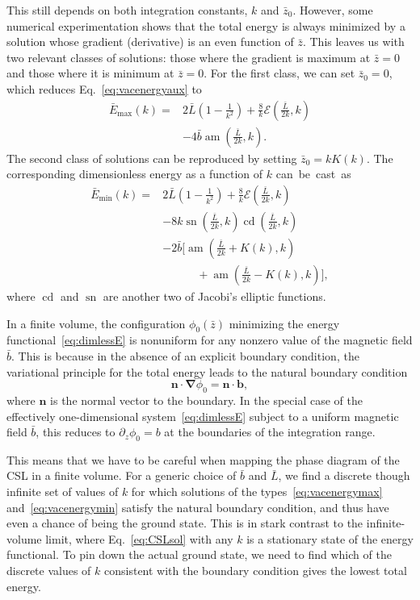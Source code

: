 \documentclass[pdflatex,iicol,sn-mathphys-num]{sn-jnl}
\let\p=\phi
\let\de=\partial
\DeclareMathOperator{\am}{am}%
\DeclareMathOperator{\cd}{cd}%
\DeclareMathOperator{\sn}{sn}%
\newcommand{\vek}[1]{\bm{#1}}%
\newcommand{\grad}{\vek\nabla}%
\newcommand{\bmag}{b}%
\begin{document}
This still depends on both integration constants, $k$ and $\bar z_0$. However, some numerical experimentation shows that the total energy is always minimized by a solution whose gradient (derivative) is an even function of $\bar z$. This leaves us with two relevant classes of solutions: those where the gradient is maximum at $\bar z=0$ and those where it is minimum at $\bar z=0$. For the first class, we can set $\bar z_0=0$, which reduces Eq.~\eqref{eq:vacenergyaux} to
\begin{equation}
\begin{split}
\bar E_\text{max}(k)={}&2\bar L\left(1-\frac1{k^2}\right)+\frac8k\mathcal E(\tfrac{\bar L}{2k},k)\\
&-4\bar\bmag\am(\tfrac{\bar L}{2k},k).
\end{split}
\label{eq:vacenergymax}
\end{equation}
The second class of solutions can be reproduced by setting $\bar z_0=kK(k)$. The corresponding dimensionless energy as a function of $k$ can~be~cast~as
\begin{equation}
\begin{split}
\bar E_\text{min}(k)={}&2\bar L\left(1-\frac1{k^2}\right)+\frac8k\mathcal E(\tfrac{\bar L}{2k},k)\\
&-8k\sn(\tfrac{\bar L}{2k},k)\cd(\tfrac{\bar L}{2k},k)\\
&-2\bar\bmag\bigl[\am(\tfrac{\bar L}{2k}+K(k),k)\\
&\qquad\quad+\am(\tfrac{\bar L}{2k}-K(k),k)\bigr],
\end{split}
\label{eq:vacenergymin}
\end{equation}
where $\cd$ and $\sn$ are another two of Jacobi's elliptic functions.

In a finite volume, the configuration $\p_0(\bar z)$ minimizing the energy functional~\eqref{eq:dimlessE} is nonuniform for any nonzero value of the magnetic field $\bar\bmag$. This is because in the absence of an explicit boundary condition, the variational principle for the total energy leads to the natural boundary condition
\begin{equation}
\vek n\cdot\grad\p_0=\vek n\cdot\vek\bmag,
\label{eq:naturalBC}
\end{equation}
where $\vek n$ is the normal vector to the boundary. In the special case of the effectively one-dimensional system~\eqref{eq:dimlessE} subject to a uniform magnetic field $\bar\bmag$, this reduces to $\de_ z\p_0=\bmag$ at the boundaries of the integration range. 

This means that we have to be careful when mapping the phase diagram of the CSL in a finite volume. For a generic choice of $\bar\bmag$ and $\bar L$, we find a discrete though infinite set of values of $k$ for which solutions of the types~\eqref{eq:vacenergymax} and~\eqref{eq:vacenergymin} satisfy the natural boundary condition, and thus have even a chance of being the ground state. This is in stark contrast to the infinite-volume limit, where Eq.~\eqref{eq:CSLsol} with any $k$ is a stationary state of the energy functional. To pin down the actual ground state, we need to find which of the discrete values of $k$ consistent with the boundary condition gives the lowest total energy. 
\end{document}
